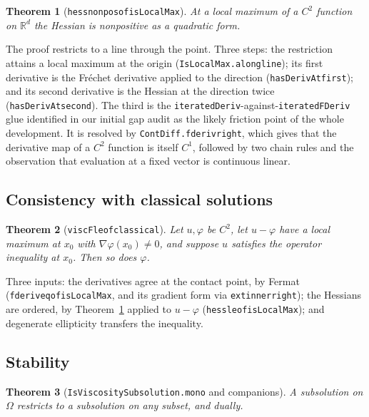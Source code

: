 \documentclass[11pt,reqno]{amsart}
\newcommand{\LEANREF}[1]{\texttt{\small\def\_{\textunderscore\allowbreak}#1}}
\newcommand{\R}{\mathbb{R}}
\theoremstyle{plain}
\newtheorem{theorem}{Theorem}[section]
\theoremstyle{definition}
\begin{document}
\begin{theorem}[\LEANREF{hess\_nonpos\_of\_isLocalMax}]\label{thm:somulti}
At a local maximum of a $C^2$ function on $\R^d$ the Hessian is nonpositive as
a quadratic form.
\end{theorem}

The proof restricts to a line through the point. Three steps: the restriction
attains a local maximum at the origin
(\LEANREF{IsLocalMax.along\_line}); its first derivative is the Fréchet
derivative applied to the direction (\LEANREF{hasDerivAt\_first}); and its
second derivative is the Hessian at the direction twice
(\LEANREF{hasDerivAt\_second}). The third is the
\LEANREF{iteratedDeriv}-against-\LEANREF{iteratedFDeriv} glue identified in our
initial gap audit as the likely friction point of the whole development. It is
resolved by \LEANREF{ContDiff.fderiv\_right}, which gives that the derivative
map of a $C^2$ function is itself $C^1$, followed by two chain rules and the
observation that evaluation at a fixed vector is continuous linear.

\subsection{Consistency with classical solutions}

\begin{theorem}[\LEANREF{viscF\_le\_of\_classical}]\label{thm:consistency}
Let $u, \varphi$ be $C^2$, let $u - \varphi$ have a local maximum at $x_0$ with
$\nabla\varphi(x_0) \ne 0$, and suppose $u$ satisfies the operator inequality
at $x_0$. Then so does $\varphi$.
\end{theorem}

Three inputs: the derivatives agree at the contact point, by Fermat
(\LEANREF{fderiv\_eq\_of\_isLocalMax}, and its gradient form via
\LEANREF{ext\_inner\_right}); the Hessians are ordered, by
Theorem~\ref{thm:somulti} applied to $u - \varphi$
(\LEANREF{hess\_le\_of\_isLocalMax}); and degenerate ellipticity transfers the
inequality.

\subsection{Stability}\label{ssec:stability}

\begin{theorem}[\LEANREF{IsViscositySubsolution.mono} and
companions]\label{thm:stab-mono}
A subsolution on $\Omega$ restricts to a subsolution on any subset, and dually.
\end{theorem}
\end{document}
